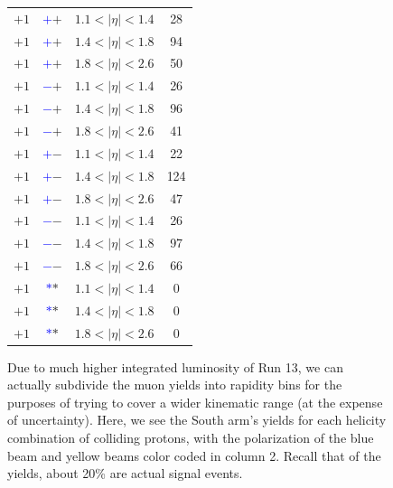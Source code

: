 \begin{figure}
\begin{minipage}[c]{0.67\textwidth}
\begin{tabular}{cccc}
      $+1$ &\textbf{\textcolor{blue}{$+$}\textcolor{ucrgold}{$+$}} & $1.1 <\vert\eta\vert< 1.4$ & 28 \\
      $+1$ &\textbf{\textcolor{blue}{$+$}\textcolor{ucrgold}{$+$}} & $1.4 <\vert\eta\vert< 1.8$ & 94 \\
      $+1$ &\textbf{\textcolor{blue}{$+$}\textcolor{ucrgold}{$+$}} & $1.8 <\vert\eta\vert< 2.6$ & 50 \\
      $+1$ &\textbf{\textcolor{blue}{$-$}\textcolor{ucrgold}{$+$}} & $1.1 <\vert\eta\vert< 1.4$ & 26 \\
      $+1$ &\textbf{\textcolor{blue}{$-$}\textcolor{ucrgold}{$+$}} & $1.4 <\vert\eta\vert< 1.8$ & 96 \\
      $+1$ &\textbf{\textcolor{blue}{$-$}\textcolor{ucrgold}{$+$}} & $1.8 <\vert\eta\vert< 2.6$ & 41 \\
      $+1$ &\textbf{\textcolor{blue}{$+$}\textcolor{ucrgold}{$-$}} & $1.1 <\vert\eta\vert< 1.4$ & 22 \\
      $+1$ &\textbf{\textcolor{blue}{$+$}\textcolor{ucrgold}{$-$}} & $1.4 <\vert\eta\vert< 1.8$ & 124 \\
      $+1$ &\textbf{\textcolor{blue}{$+$}\textcolor{ucrgold}{$-$}} & $1.8 <\vert\eta\vert< 2.6$ & 47 \\
      $+1$ &\textbf{\textcolor{blue}{$-$}\textcolor{ucrgold}{$-$}} & $1.1 <\vert\eta\vert< 1.4$ & 26 \\
      $+1$ &\textbf{\textcolor{blue}{$-$}\textcolor{ucrgold}{$-$}} & $1.4 <\vert\eta\vert< 1.8$ & 97 \\
      $+1$ &\textbf{\textcolor{blue}{$-$}\textcolor{ucrgold}{$-$}} & $1.8 <\vert\eta\vert< 2.6$ & 66 \\
      $+1$ &\textbf{\textcolor{blue}{$*$}\textcolor{ucrgold}{$*$}} & $1.1 <\vert\eta\vert< 1.4$ & 0 \\
      $+1$ &\textbf{\textcolor{blue}{$*$}\textcolor{ucrgold}{$*$}} & $1.4 <\vert\eta\vert< 1.8$ & 0 \\
      $+1$ &\textbf{\textcolor{blue}{$*$}\textcolor{ucrgold}{$*$}} & $1.8 <\vert\eta\vert< 2.6$ & 0 \\
      \bottomrule
    \end{tabular}
  \end{minipage}\hfill
  \begin{minipage}[c]{0.3\textwidth}
    \caption{
      Due to much higher integrated luminosity of Run 13, we can actually
      subdivide the muon yields into rapidity bins for the purposes of trying to
      cover a wider kinematic range (at the expense of uncertainty). Here, we see
      the South arm's yields for each helicity combination of colliding protons,
      with the polarization of the blue beam and yellow beams color coded in
      column 2. Recall that of the yields, about 20\% are actual signal events.
    }
    \label{tab:south_sorted_muons_eta_bins}
  \end{minipage}
\end{figure}

